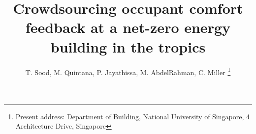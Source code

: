 \documentclass[a4paper]{jpconf} %
\begin{document}



\title{Crowdsourcing occupant comfort feedback at a net-zero energy building in the tropics} 

 \author{ T. Sood, M. Quintana,
 P. Jayathissa, M. AbdelRahman, C. Miller \footnote[1]{Present address:
 Department of Building, National University of Singapore, 4 Architecture Drive, Singapore}}


 \address{Building and Urban Data Science (BUDS) Group,  Department of Building, School of Design and Environment (SDE), National University of Singapore (NUS), Singapore 117566}








\end{document}
